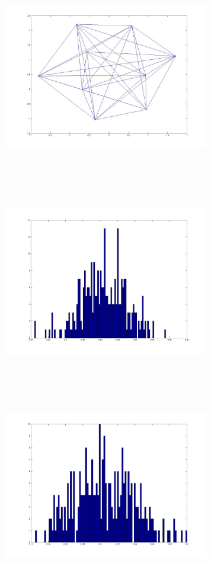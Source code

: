 \includegraphics[width=9.0cm,height=9.0cm]{images/GraphTheory/Clique_9_Members.jpg}
\includegraphics[width=9.0cm,height=9.0cm]{images/GraphTheory/ClusterCoeff_Hist_ErdoReyani_Graph_SameVertexSet_mean0_421961099815438.jpg}
\includegraphics[width=9.0cm,height=9.0cm]{images/GraphTheory/ClusterCoeff_Hist_PreScaleFree_mean_0_205047904366710.jpg}
